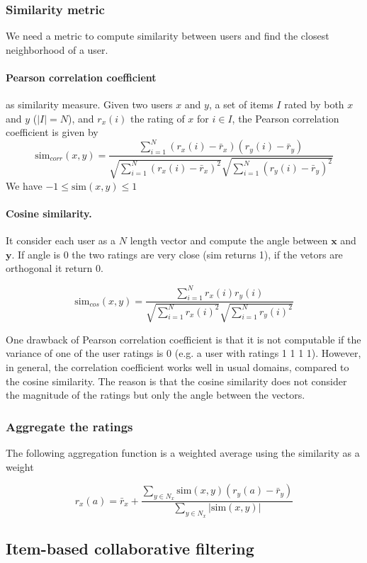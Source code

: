\subsubsection{Similarity metric}
We need a metric to compute similarity between users and find the closest neighborhood of a user. 

\paragraph{Pearson correlation coefficient} as similarity measure. Given two users $x$ and $y$, a set of items $I$ rated by both $x$ and $y$ ($|I| = N$), and $r_x(i)$ the rating of $x$ for $i\in I$, the Pearson correlation coefficient is given by
\[
  \text{sim}_{corr}(x,y) = \frac {\sum_{i=1}^N (r_x(i)-\bar r_x)(r_y(i) - \bar r_y) } { \sqrt {\sum_{i=1}^N (r_x(i) - \bar r_x)^2} \sqrt {\sum_{i=1}^N (r_y(i) - \bar r_y)^2}}
\]
We have $-1 \leq \text{sim}(x,y) \leq 1$


\paragraph{Cosine similarity.} It consider each user as a $N$ length vector and compute the angle between $\mathbf{x}$ and $\mathbf{y}$. If angle is 0 the two ratings are very close (sim returns 1), if the vetors are orthogonal it return 0.

\[
  \text{sim}_{cos}(x,y) = \frac {\sum_{i=1}^N r_x(i)r_y(i)}{\sqrt{\sum_{i=1}^N r_x(i)^2} \sqrt{\sum_{i=1}^N r_y(i)^2}}
\]

One drawback of Pearson correlation coefficient is that it is not computable if the variance of one of the user ratings is 0 (e.g. a user with ratings 1 1 1 1). However, in general, the correlation coefficient works well in usual domains, compared to the cosine similarity. The reason is that the cosine similarity does not consider the magnitude of the ratings but only the angle between the vectors.

\subsubsection{Aggregate the ratings}

The following aggregation function is a weighted average using the similarity as a weight

\[
  r_x(a) = \bar r_x + \frac {\sum_{y \in N_x} \text{sim}(x,y)(r_y(a) - \bar r_y)} {\sum_{y \in N_x} |\text{sim}(x,y)|}
\]

\subsection{Item-based collaborative filtering}

